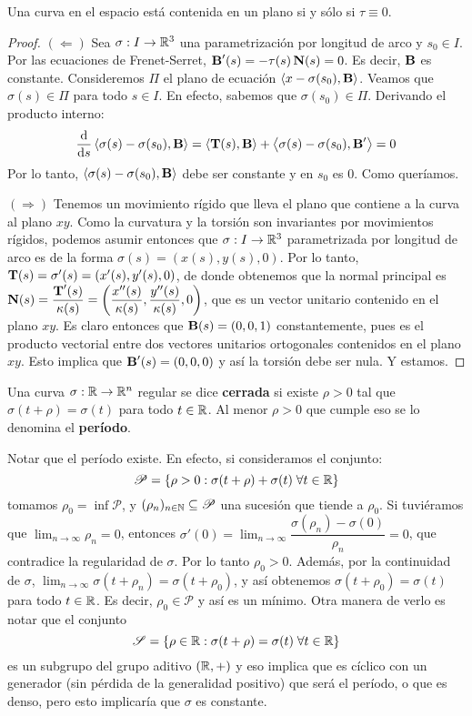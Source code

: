 \begin{prop}
Una curva en el espacio está contenida en un plano si y sólo si $\tau\equiv 0$.
\begin{proof}
\hfill

$(\Longleftarrow)$ Sea $\sigma:I\to\mathbb{R}^3$ una parametrización por longitud de arco y $s_0\in I$. Por las ecuaciones de Frenet-Serret, $\operatorname{\mathbf{B}}'(s)=-\tau(s)\operatorname{\mathbf{N}}(s)=0$. Es decir, $\operatorname{\mathbf{B}}$ es constante. Consideremos $\Pi$ el plano de ecuación $\left\langle x-\sigma(s_0),\operatorname{\mathbf{B}} \right\rangle$. Veamos que $\sigma(s)\in\Pi$ para todo $s\in I$. En efecto, sabemos que $\sigma(s_0)\in\Pi$. Derivando el producto interno: $$\dfrac{\mathop{}\!\mathrm{d}}{\mathop{}\!\mathrm{d} s}\left\langle \sigma(s)-\sigma(s_0),\operatorname{\mathbf{B}} \right\rangle = \left\langle \operatorname{\mathbf{T}}(s),\operatorname{\mathbf{B}} \right\rangle + \left\langle \sigma(s)-\sigma(s_0),\operatorname{\mathbf{B}}' \right\rangle = 0$$ Por lo tanto, $\left\langle \sigma(s)-\sigma(s_0),\operatorname{\mathbf{B}} \right\rangle$ debe ser constante y en $s_0$ es $0$. Como queríamos.

$(\Longrightarrow)$ Tenemos un movimiento rígido que lleva el plano que contiene a la curva al plano $xy$. Como la curvatura y la torsión son invariantes por movimientos rígidos, podemos asumir entonces que $\sigma:I\to\mathbb{R}^3$ parametrizada por longitud de arco es de la forma $\sigma(s)=(x(s),y(s),0)$. Por lo tanto, $\operatorname{\mathbf{T}}(s)=\sigma'(s)=(x'(s),y'(s),0)$, de donde obtenemos que la normal principal es $\operatorname{\mathbf{N}}(s)=\dfrac{\operatorname{\mathbf{T}}'(s)}{\kappa(s)}=\left(\dfrac{x''(s)}{\kappa(s)},\dfrac{y''(s)}{\kappa(s)},0\right)$, que es un vector unitario contenido en el plano $xy$. Es claro entonces que $\operatorname{\mathbf{B}}(s) = (0,0,1)$ constantemente, pues es el producto vectorial entre dos vectores unitarios ortogonales contenidos en el plano $xy$. Esto implica que $\operatorname{\mathbf{B}}'(s)=(0,0,0)$ y así la torsión debe ser nula. Y estamos.
\end{proof}
\end{prop}

\begin{defn}
Una curva $\sigma:\mathbb{R}\to\mathbb{R}^n$ regular se dice \textbf{cerrada} si existe $\rho>0$ tal que $\sigma(t+\rho)=\sigma(t)$ para todo $t\in\mathbb{R}$. Al menor $\rho>0$ que cumple eso se lo denomina el \textbf{período}.
\end{defn}

\begin{obs}
Notar que el período existe. En efecto, si consideramos el conjunto: $$\mathscr{P}=\{\rho>0:\sigma(t+\rho)+\sigma(t)\;\forall t\in\mathbb{R}\}$$ tomamos $\rho_0=\inf\mathscr{P}$, y $(\rho_n)_{n\in\mathbb{N}}\subseteq\mathscr{P}$ una sucesión que tiende a $\rho_0$. Si tuviéramos que $\displaystyle\lim_{n\to\infty}\rho_n=0$, entonces $\sigma'(0)=\lim_{n\to\infty}\dfrac{\sigma(\rho_n)-\sigma(0)}{\rho_n} = 0$, que contradice la regularidad de $\sigma$. Por lo tanto $\rho_0>0$. Además, por la continuidad de $\sigma$, $\displaystyle\lim_{n\to\infty}\sigma(t+\rho_n)=\sigma(t+\rho_0)$, y así obtenemos $\sigma(t+\rho_0)=\sigma(t)$ para todo $t\in\mathbb{R}$. Es decir, $\rho_0\in\mathscr{P}$ y así es un mínimo. Otra manera de verlo es notar que el conjunto $$\mathscr{S}=\{\rho\in\mathbb{R}:\sigma(t+\rho)=\sigma(t)\;\forall t\in\mathbb{R}\}$$ es un subgrupo del grupo aditivo $(\mathbb{R},+)$ y eso implica que es cíclico con un generador (sin pérdida de la generalidad positivo) que será el período, o que es denso, pero esto implicaría que $\sigma$ es constante.
\end{obs}

